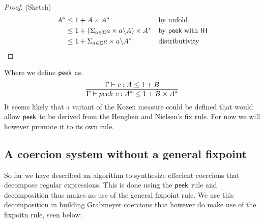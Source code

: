 \documentclass[a4paper,UKenglish,cleveref, autoref, thm-restate]{lipics-v2021}
\newcommand\mycomment[1]{}
\begin{document}
\begin{proof} (Sketch)
\begin{align}
A^* &\leq  1 + A \times A^* && \text{by unfold}\\
 &\leq 1 + (\Sigma_{a \in \Sigma} a\times a \backslash A) \times A^* && \text{by } \textsf{peek}~\text{with }\textsf{IH}\\
 &\leq 1 + \Sigma_{a \in \Sigma} a\times a \backslash A^* && \text{distributivity} 
\end{align}
\end{proof}
Where we define $\textsf{peek}$ as.
\[ \infer{\containsG{peek ~ c}{A^*}{1 + B \times A^*}}{\containsG{c}{A}{1 + B}} \]
It seems likely that a variant of the Kozen measure could be defined that would allow $\textsf{peek}$ to be derived from the Henglein and Nielsen's fix rule. For now we will however promote it to its own rule. 
\subsection{A coercion system without a general fixpoint}
So far we have described an algorithm to synthesize effecient coercions that decompose \mycomment{how about recompose} regular expressions. This is done using the $\textsf{peek}$ rule and decomposition thus makes no use of the general fixpoint rule. We use this decomposition in building Grabmeyer coercions that however do make use of the fixpoitn rule, seen below:

\end{document}
